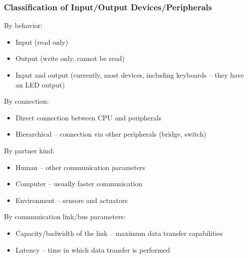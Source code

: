 \documentclass{beamer}
\begin{document}
\begin{frame}
\frametitle{Classification of Input/Output Devices/Peripherals}
By behavior:
\begin{itemize}
\item Input (read only)
\item Output (write only, cannot be read)
\item Input and output (currently, most devices, including keyboards -- they have an LED output)
\end{itemize}

By connection:
\begin{itemize}
\item Direct connection between CPU and peripherals
\item Hierarchical -- connection via other peripherals (bridge, switch)
\end{itemize}

By partner kind:
\begin{itemize}
\item Human -- other communication parameters
\item Computer -- usually faster communication
\item Environment -- sensors and actuators
\end{itemize}

By communication link/bus parameters:
\begin{itemize}
\item Capacity/badwidth of the link -- maximum data transfer capabilities
\item Latency -- time in which data transfer is performed
\end{itemize}
\end{frame}
\end{document}
